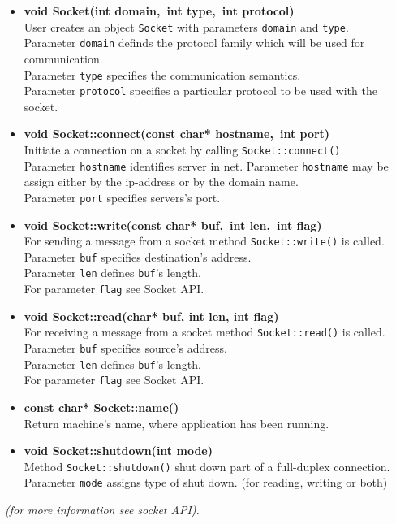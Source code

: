 \documentclass[10pt]{article}
\begin{document}
  \begin{itemize}
	\item {\bf void Socket(int domain,\ int type,\ int protocol)} \\ 
           User creates an object \verb|Socket| with parameters \verb|domain| 
           and \verb|type|.\\
           Parameter \verb|domain| definds the  protocol family which will 
           be used for communication.\\ 
           Parameter \verb|type| specifies the communication semantics. \\
           Parameter \verb|protocol| specifies a particular protocol 
           to be used with the socket. 
	\item {\bf void Socket::connect(const char* hostname,\ int port)}\\
           Initiate a connection on a socket by calling 
           \verb|Socket::connect()|.\\
           Parameter \verb|hostname| identifies server in net. Parameter 
           \verb|hostname| may be assign either by the ip-address 
           or by the domain name.\\
           Parameter \verb|port| specifies servers's port. 
	\item {\bf void Socket::write(const char* buf,\ int len,\ int flag) }\\ 
           For sending a message from a socket  method \verb|Socket::write()|
           is called.\\
           Parameter \verb|buf| specifies destination's address.\\
           Parameter \verb|len| defines \verb|buf|'s length.\\
           For parameter \verb|flag| see Socket API.
        \item  {\bf void Socket::read(char* buf, int len, int flag)} \\
           For receiving a message from a socket method 
           \verb|Socket::read()| is called.\\
           Parameter \verb|buf| specifies source's address.\\
           Parameter \verb|len| defines \verb|buf|'s length.\\
           For parameter \verb|flag| see Socket API.
        \item { \bf const char* Socket::name()  }\\
           Return machine's name, where application has been running.
	\item {\bf void Socket::shutdown(int mode) } \\ 
           Method \verb|Socket::shutdown()| shut down part 
           of a full-duplex connection.\\
           Parameter \verb|mode| assigns type of shut down.
           (for reading, writing or both)
  \end{itemize} 
  { \sl (for more information see socket API). } \\
\newpage
\end{document}
